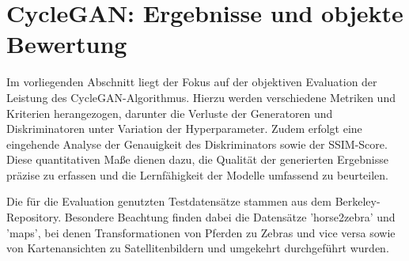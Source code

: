 \section{CycleGAN: Ergebnisse und objekte Bewertung}

Im vorliegenden Abschnitt liegt der Fokus auf der objektiven Evaluation der Leistung des CycleGAN-Algorithmus. Hierzu werden verschiedene Metriken und Kriterien herangezogen, darunter die Verluste der Generatoren und Diskriminatoren unter Variation der Hyperparameter. Zudem erfolgt eine eingehende Analyse der Genauigkeit des Diskriminators sowie der SSIM-Score. Diese quantitativen Maße dienen dazu, die Qualität der generierten Ergebnisse präzise zu erfassen und die Lernfähigkeit der Modelle umfassend zu beurteilen.

Die für die Evaluation genutzten Testdatensätze stammen aus dem Berkeley-Repository. Besondere Beachtung finden dabei die Datensätze 'horse2zebra' und 'maps', bei denen Transformationen von Pferden zu Zebras und vice versa sowie von Kartenansichten zu Satellitenbildern und umgekehrt durchgeführt wurden.
